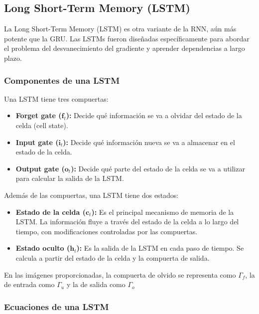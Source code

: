 \documentclass{article}
\begin{document}
\subsection{Long Short-Term Memory (LSTM)}

La Long Short-Term Memory (LSTM) es otra variante de la RNN, aún más potente que la GRU.  Las LSTMs fueron diseñadas específicamente para abordar el problema del desvanecimiento del gradiente y aprender dependencias a largo plazo.

\subsubsection{Componentes de una LSTM}

Una LSTM tiene tres compuertas:

\begin{itemize}
    \item \textbf{Forget gate (\(\mathbf{f}_t\)):}  Decide qué información se va a olvidar del estado de la celda (cell state).
    \item \textbf{Input gate (\(\mathbf{i}_t\)):}  Decide qué información nueva se va a almacenar en el estado de la celda.
    \item \textbf{Output gate (\(\mathbf{o}_t\)):}  Decide qué parte del estado de la celda se va a utilizar para calcular la salida de la LSTM.
\end{itemize}

Además de las compuertas, una LSTM tiene dos estados:

\begin{itemize}
    \item \textbf{Estado de la celda (\(\mathbf{c}_t\)):}  Es el principal mecanismo de memoria de la LSTM.  La información fluye a través del estado de la celda a lo largo del tiempo, con modificaciones controladas por las compuertas.
    \item \textbf{Estado oculto (\(\mathbf{h}_t\)):}  Es la salida de la LSTM en cada paso de tiempo.  Se calcula a partir del estado de la celda y la compuerta de salida.
\end{itemize}
En las imágenes proporcionadas, la compuerta de olvido se representa como \(\Gamma_f\), la de entrada como \(\Gamma_u\) y la de salida como \(\Gamma_o\)

\subsubsection{Ecuaciones de una LSTM}
\end{document}
